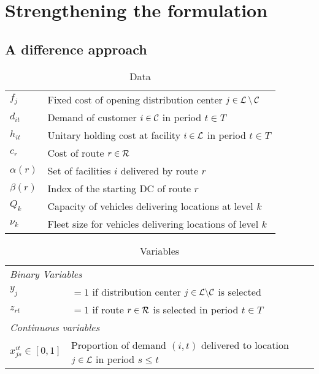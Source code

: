 \section{Strengthening the formulation}
\subsection{A difference approach}
\begin{table}[htbp]
\centering
\begin{tabular}{ll}
\toprule
$f_j$ & Fixed cost of opening distribution center $j\in\mathcal{L} \setminus \mathcal{C}$\\ 
$d_{it}$ & Demand of customer $i\in\mathcal{C}$ in period $t \in T$\\
        $h_{it}$ & Unitary holding cost at facility $i\in\mathcal{L}$ in period $t \in T$\\
        $c_r$ & Cost of route $r\in \mathcal{R}$\\
        $\alpha(r)$ & Set of facilities $i$ delivered by route $r$\\
        $\beta(r)$ & Index of the starting DC of route $r$\\
        $Q_k$ & Capacity of vehicles delivering locations at level $k$\\ 
        $\nu_k$ & Fleet size for vehicles delivering locations of level $k$\\ 
        \bottomrule
        \end{tabular}
        \caption{Data}
        \label{tab:data}
        \end{table}       
        \begin{table}[htbp]
        \centering
        \begin{tabular}{ll}
        \toprule
        \multicolumn{2}{l}{\textit{Binary Variables}}\\
            $y_{j}$ & $=1$ if distribution center $j \in \mathcal{L} \backslash \mathcal{C}$ is selected \\
            $z_{rt}$ & $=1$ if route $r \in \mathcal{R}$  is selected in period $t \in T$\\
            \midrule
            \multicolumn{2}{l}{\textit{Continuous variables}}\\
                $x^{it}_{js}\in[0,1]$ & Proportion of demand $(i,t)$ delivered to location $j\in \mathcal{L}$ in period $s\leq t$\\
                \bottomrule
                \end{tabular}
                \caption{Variables}
                \label{tab:var}
                \end{table}    

